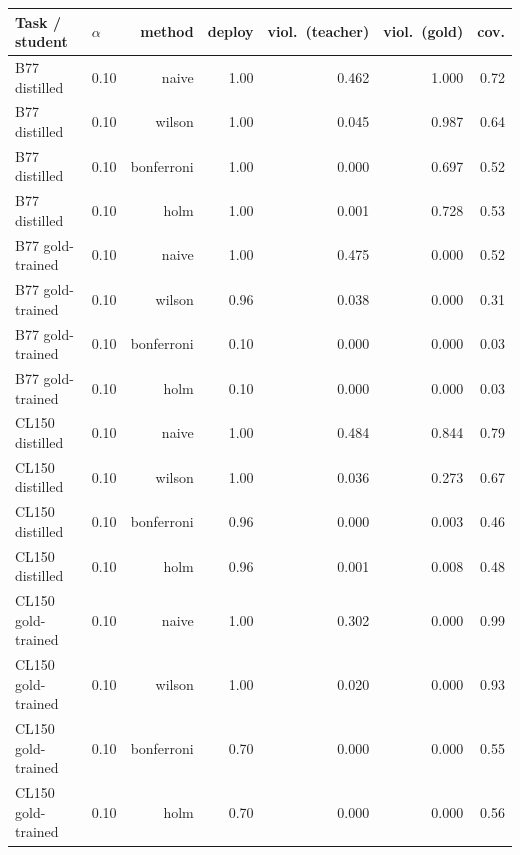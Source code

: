 \begin{tabular}{llrrrrr}
\toprule
Task / student & $\alpha$ & method & deploy & viol.\ (teacher) & viol.\ (gold) & cov.\\
\midrule
B77 distilled & 0.10 & naive & 1.00 & 0.462 & 1.000 & 0.72\\
B77 distilled & 0.10 & wilson & 1.00 & 0.045 & 0.987 & 0.64\\
B77 distilled & 0.10 & bonferroni & 1.00 & 0.000 & 0.697 & 0.52\\
B77 distilled & 0.10 & holm & 1.00 & 0.001 & 0.728 & 0.53\\
B77 gold-trained & 0.10 & naive & 1.00 & 0.475 & 0.000 & 0.52\\
B77 gold-trained & 0.10 & wilson & 0.96 & 0.038 & 0.000 & 0.31\\
B77 gold-trained & 0.10 & bonferroni & 0.10 & 0.000 & 0.000 & 0.03\\
B77 gold-trained & 0.10 & holm & 0.10 & 0.000 & 0.000 & 0.03\\
CL150 distilled & 0.10 & naive & 1.00 & 0.484 & 0.844 & 0.79\\
CL150 distilled & 0.10 & wilson & 1.00 & 0.036 & 0.273 & 0.67\\
CL150 distilled & 0.10 & bonferroni & 0.96 & 0.000 & 0.003 & 0.46\\
CL150 distilled & 0.10 & holm & 0.96 & 0.001 & 0.008 & 0.48\\
CL150 gold-trained & 0.10 & naive & 1.00 & 0.302 & 0.000 & 0.99\\
CL150 gold-trained & 0.10 & wilson & 1.00 & 0.020 & 0.000 & 0.93\\
CL150 gold-trained & 0.10 & bonferroni & 0.70 & 0.000 & 0.000 & 0.55\\
CL150 gold-trained & 0.10 & holm & 0.70 & 0.000 & 0.000 & 0.56\\
\bottomrule
\end{tabular}
